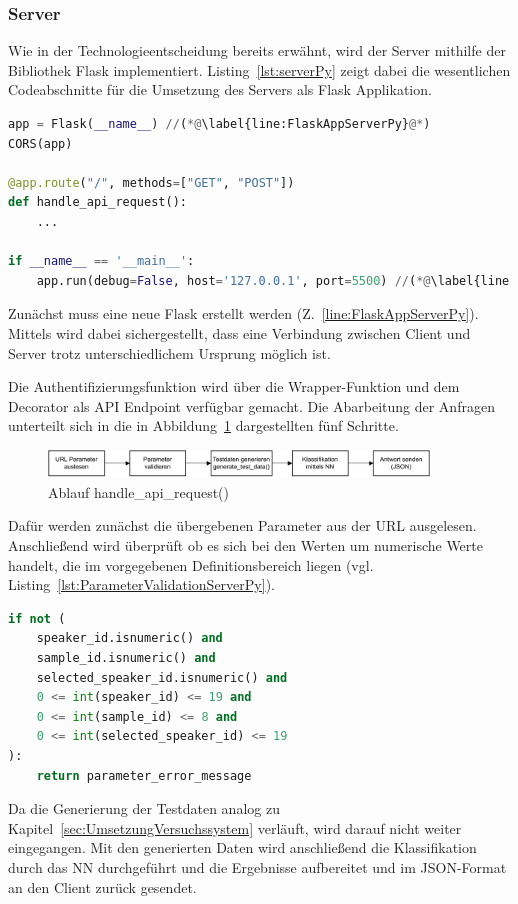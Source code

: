 \subsubsection{Server} 
Wie in der Technologieentscheidung bereits erwähnt, wird der Server mithilfe der Bibliothek Flask implementiert.
Listing~\ref{lst:serverPy} zeigt dabei die wesentlichen Codeabschnitte für die Umsetzung des Servers als Flask Applikation.
\begin{lstlisting}[language=Python,caption=Ausschnitt server.py,label=lst:serverPy]
app = Flask(__name__) //(*@\label{line:FlaskAppServerPy}@*)
CORS(app)

@app.route("/", methods=["GET", "POST"])
def handle_api_request():
    ...

if __name__ == '__main__':
    app.run(debug=False, host='127.0.0.1', port=5500) //(*@\label{line:AppRunServerPy}@*)
\end{lstlisting}
Zunächst muss eine neue Flask  erstellt werden (Z.~\ref{line:FlaskAppServerPy}).
Mittels  wird dabei sichergestellt, dass eine Verbindung zwischen Client und Server trotz unterschiedlichem Ursprung möglich ist.

Die Authentifizierungsfunktion wird über die Wrapper-Funktion  und dem Decorator  als \ac{API} Endpoint verfügbar gemacht.
Die Abarbeitung der Anfragen unterteilt sich in die in Abbildung~\ref{fig:AblaufdiagrammServerHandleApiRequest} dargestellten fünf Schritte.
\begin{figure}[H]
    \centering
    \includegraphics[width=0.9\textwidth, keepaspectratio]{images/AblaufdiagrammServerHandleApiRequest.pdf}
    \caption{Ablauf handle\_api\_request()}
    \label{fig:AblaufdiagrammServerHandleApiRequest}
\end{figure}
Dafür werden zunächst die übergebenen Parameter aus der URL ausgelesen.
Anschließend wird überprüft ob es sich bei den Werten um numerische Werte handelt, die im vorgegebenen Definitionsbereich liegen (vgl. Listing~\ref{lst:ParameterValidationServerPy}).
\begin{lstlisting}[language=Python,caption=Parametervalidierung handle\_api\_request() - server.py,label=lst:ParameterValidationServerPy]
if not (
    speaker_id.isnumeric() and 
    sample_id.isnumeric() and 
    selected_speaker_id.isnumeric() and
    0 <= int(speaker_id) <= 19 and
    0 <= int(sample_id) <= 8 and
    0 <= int(selected_speaker_id) <= 19
):
    return parameter_error_message
\end{lstlisting}
Da die Generierung der Testdaten analog zu Kapitel~\ref{sec:UmsetzungVersuchssystem} verläuft, wird darauf nicht weiter eingegangen.
Mit den generierten Daten wird anschließend die Klassifikation durch das \ac{NN} durchgeführt und die Ergebnisse aufbereitet und im JSON-Format an den Client zurück gesendet.

